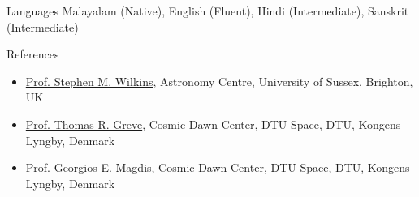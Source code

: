 \documentclass[a4paper,10pt]{resume} %
\begin{document}

%

\begin{rSection}{Languages}
Malayalam (Native), English (Fluent), Hindi (Intermediate), Sanskrit (Intermediate)
\end{rSection}

\begin{rSection}{References}
\begin{itemize}
   \item \href{http://stephenwilkins.co.uk/}{Prof. Stephen M. Wilkins}, Astronomy Centre, University of Sussex, Brighton, UK
   \item \href{https://cosmicdawn.dk/staff/thomas/}{Prof. Thomas R. Greve}, Cosmic Dawn Center, DTU Space, DTU, Kongens Lyngby, Denmark
   \item \href{https://cosmicdawn.dk/staff/georgios-magdis/}{Prof. Georgios E. Magdis}, Cosmic Dawn Center, DTU Space, DTU, Kongens Lyngby, Denmark
\end{itemize}
\end{rSection}
\end{document}
